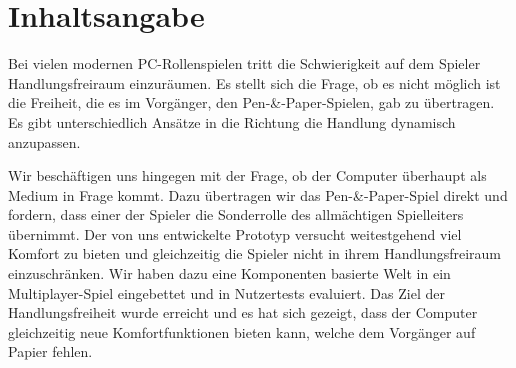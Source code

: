 \chapter*{Inhaltsangabe}

Bei vielen modernen PC-Rollenspielen tritt die Schwierigkeit auf dem Spieler Handlungsfreiraum einzuräumen. Es stellt sich die Frage, ob es nicht möglich ist die Freiheit, die es im Vorgänger, den Pen-\&-Paper-Spielen, gab zu übertragen. Es gibt unterschiedlich Ansätze in die Richtung die Handlung dynamisch anzupassen.

Wir beschäftigen uns hingegen mit der Frage, ob der Computer überhaupt als Medium in Frage kommt. Dazu übertragen wir das Pen-\&-Paper-Spiel direkt und fordern, dass einer der Spieler die Sonderrolle des allmächtigen Spielleiters übernimmt. Der von uns entwickelte Prototyp versucht weitestgehend viel Komfort zu bieten und gleichzeitig die Spieler nicht in ihrem Handlungsfreiraum einzuschränken. Wir haben dazu eine Komponenten basierte Welt in ein Multiplayer-Spiel eingebettet und in Nutzertests evaluiert. Das Ziel der Handlungsfreiheit wurde erreicht und es hat sich gezeigt, dass der Computer gleichzeitig neue Komfortfunktionen bieten kann, welche dem Vorgänger auf Papier fehlen.
